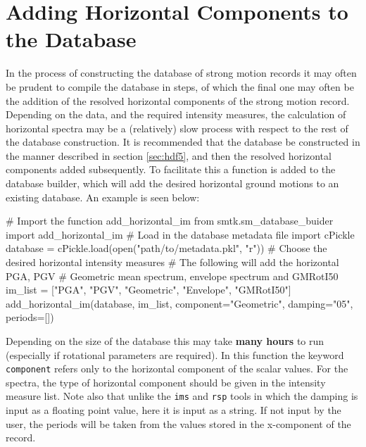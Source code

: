 \section{Adding Horizontal Components to the Database}

In the process of constructing the database of strong motion records it may often be prudent to compile the database in steps, of which the final one may often be the addition of the resolved horizontal components of the strong motion record. Depending on the data, and the required intensity measures, the calculation of horizontal spectra may be a (relatively) slow process with respect to the rest of the database construction. It is recommended that the database be constructed in the manner described in section \ref{sec:hdf5}, and then the resolved horizontal components added subsequently. To facilitate this a function is added to the database builder, which will add the desired horizontal ground motions to an existing database. An example is seen below:

\begin{python}[frame=single]
# Import the function add_horizontal_im
from smtk.sm_database_buider import add_horizontal_im
# Load in the database metadata file
import cPickle
database = cPickle.load(open("path/to/metadata.pkl", "r"))
# Choose the desired horizontal intensity measures
# The following will add the horizontal PGA, PGV
# Geometric mean spectrum, envelope spectrum and GMRotI50
im_list = ["PGA", "PGV", "Geometric", "Envelope", "GMRotI50"]
add_horizontal_im(database,
                  im_list, 
                  component="Geometric",
                  damping="05",
                  periods=[])
\end{python}

Depending on the size of the database this may take \textbf{many hours} to run (especially if rotational parameters are required). In this function the keyword \verb=component= refers only to the horizontal component of the scalar values. For the spectra, the type of horizontal component should be given in the intensity measure list. Note also that unlike the \verb=ims= and \verb=rsp= tools in which the damping is input as a floating point value, here it is input as a string. If not input by the user, the periods will be taken from the values stored in the x-component of the record. 

